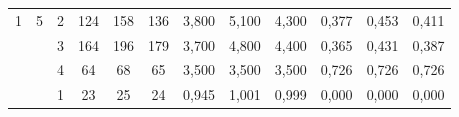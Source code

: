 \documentclass[licencjacka]{pracamgr}
\begin{document}
\begin{table}[H]
{\begin{tabular}{@{}cccccccccccc@{}}
1                                                              & 5                                                      & 2    & 124                                                    & 158                                                    & 136                                                       & 3,800                                                     & 5,100                                                      & 4,300                                                         & 0,377                                                              & 0,453                                                               & 0,411                                                                 \\
                                                               &                                                        & 3    & 164                                                    & 196                                                    & 179                                                       & 3,700                                                     & 4,800                                                      & 4,400                                                         & 0,365                                                              & 0,431                                                               & 0,387                                                                 \\
                                                               &                                                        & 4    & 64                                                     & 68                                                     & 65                                                        & 3,500                                                     & 3,500                                                      & 3,500                                                         & 0,726                                                              & 0,726                                                               & 0,726                                                                 \\ \midrule
                                                               &                                                        & 1    & 23                                                     & 25                                                     & 24                                                        & 0,945                                                     & 1,001                                                      & 0,999                                                         & 0,000                                                              & 0,000                                                               & 0,000                                                                 \\

\end{tabular}}
\end{table}
\end{document}
